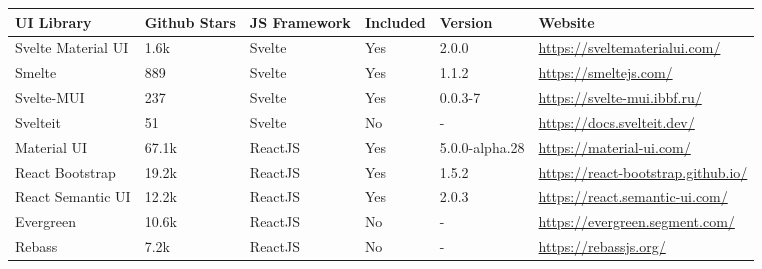 \begin{table*}[t]
  \tiny{}
  \begin{tabularx}{\textwidth}{p{} |p{} | p{} | p{} | p{} |p{}  }
    \toprule
    \textbf{UI Library}     & \textbf{Github Stars}   & \textbf{JS Framework} & \textbf{Included} & \textbf{Version} & \textbf{Website}                                                                 \\ \midrule
    Svelte Material UI      & 1.6k                    & Svelte                & Yes               & 2.0.0            & \url{https://sveltematerialui.com/}                                              \\ \hline
    Smelte                  & 889                     & Svelte                & Yes               & 1.1.2            & \url{https://smeltejs.com/}                                                      \\ \hline
    Svelte-MUI              & 237                     & Svelte                & Yes               & 0.0.3-7          & \url{https://svelte-mui.ibbf.ru/}                                                \\ \hline
    Svelteit                & 51                      & Svelte                & No                & -                & \url{https://docs.svelteit.dev/}                                                 \\ \hline
    Material UI             & 67.1k                   & ReactJS               & Yes               & 5.0.0-alpha.28   & \url{https://material-ui.com/}                                                   \\ \hline
    React Bootstrap         & 19.2k                   & ReactJS               & Yes               & 1.5.2            & \url{https://react-bootstrap.github.io/}                                         \\ \hline
    React Semantic UI       & 12.2k                   & ReactJS               & Yes               & 2.0.3            & \url{https://react.semantic-ui.com/}                                             \\ \hline
    Evergreen               & 10.6k                   & ReactJS               & No                & -                & \url{https://evergreen.segment.com/}                                             \\ \hline
    Rebass                  & 7.2k                    & ReactJS               & No                & -                & \url{https://rebassjs.org/}                                                      \\ \hline

\end{tabularx}
\end{table*}
